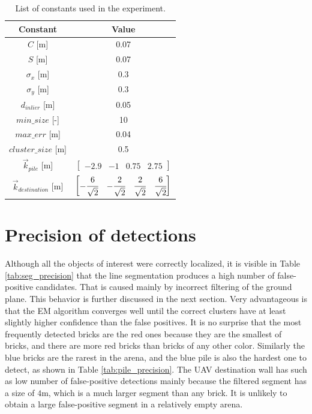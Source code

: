 \begin{table}[H]
	\centering
	\caption{List of constants used in the experiment.}
	\begin{tabular}{cc}
		\toprule
		Constant & Value \\
		\midrule
		$C$ [m] & 0.07   \\ 
		$S$ [m] & 0.07  \\
		$\sigma_x$ [m] & 0.3 \\ 
		$\sigma_y$ [m] & 0.3 \\
		$d_{inlier}$ [m] & 0.05 \\ 
		$min\_size$ [-] & 10 \\
		$max\_err$ [m] & 0.04 \\
		$cluster\_size$ [m] & 0.5 \\
		$\vec{k}_{pile} $ [m] & $\begin{bmatrix}
			-2.9 & -1 & 0.75 & 2.75
		\end{bmatrix}$ \\
		$\vec{k}_{destination}$ [m] &
		$\begin{bmatrix}
			-\cfrac{6}{\sqrt{2}} &  -\cfrac{2}{\sqrt{2}} &  \cfrac{2}{\sqrt{2}} &  \cfrac{6}{\sqrt{2}}
		\end{bmatrix}$ \\
		\bottomrule
	\end{tabular}
	\label{tab:constants}
\end{table}

\section{Precision of detections}
Although all the objects of interest were correctly localized, it is visible in Table \ref{tab:seg_precision} that the line segmentation produces a high number of false-positive candidates. That is caused mainly by incorrect filtering of the ground plane. This behavior is further discussed in the next section. Very advantageous is that the EM algorithm converges well until the correct clusters have at least slightly higher confidence than the false positives. It is no surprise that the most frequently detected bricks are the red ones because they are the smallest of bricks, and there are more red bricks than bricks of any other color. Similarly the blue bricks are the rarest in the arena, and the blue pile is also the hardest one to detect, as shown in Table \ref{tab:pile_precision}. The UAV destination wall has such as low number of false-positive detections mainly because the filtered segment has a size of $4$m, which is a much larger segment than any brick. It is unlikely to obtain a large false-positive segment in a relatively empty arena.

